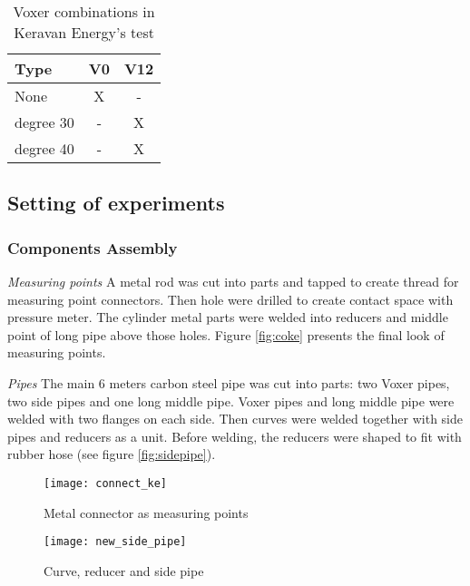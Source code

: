 \begin{table}[h]
  \centering
  \caption{Voxer combinations in Keravan Energy's test}
  \begin{tabular}{l*{2}{c}}
Type             & V0 & V12 \\
\hline
None & X & -   \\
degree 30           & - & X   \\
degree 40          & - & X   \\
\end{tabular}
  \label{table:kerava}
\end{table}
\subsection{Setting of experiments}
\subsubsection{Components Assembly}
\textit{Measuring points}\newline
A metal rod was cut into parts and tapped to create thread for measuring point connectors. Then hole were drilled to create contact space with pressure meter. The cylinder metal parts were welded into reducers and middle point of long pipe above those holes. Figure \vref{fig:coke} presents the final look of measuring points.

\textit{Pipes}\newline
The main 6 meters carbon steel pipe was cut into parts: two Voxer pipes, two side pipes and one long middle pipe. Voxer pipes and long middle pipe were welded with two flanges on each side. Then curves were welded together with side pipes and reducers as a unit. Before welding, the reducers were shaped to fit with rubber hose (see figure \vref{fig:sidepipe}).
\begin{figure}[!htb]
   \begin{minipage}{0.48\textwidth}
     \centering
     \texttt{[image: connect\_ke]}
     \caption{Metal connector as measuring points}\label{fig:coke}
   \end{minipage}\hfill
   \begin {minipage}{0.48\textwidth}
     \centering
     \texttt{[image: new\_side\_pipe]}
     \caption{Curve, reducer and side pipe}\label{fig:sidepipe}
   \end{minipage}
\end{figure}
